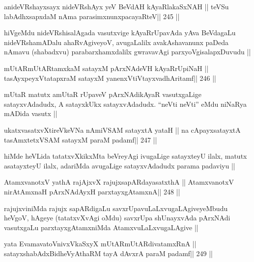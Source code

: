 \begin{shl}
anideVRshayxsayx nideVRshAyx yeV BeVdAH kAyaRlakaSxNAH ||
teVSu labAdhxsapxdaM nAma parasimxnunxpacayaRteV\hfill || 245 ||
\end{shl}

\begin{artha}
hiVgeMdu nideVRshisalAgada vasutxvige kAyaRrUpavAda yAva BeVdagaLu
nideVRshamADalu ahaRvAgiveyoV, avugaLalilx avakAshavanunx paDeda nAmavu
(shabadxvu) parabarxhamxdalilx gwravavAgi parxyoVgisalapxDuvudu ||
\end{artha}

\begin{shl}
mUtARmUtARtamxkaM satayxM pArxNAdeVH kAyaRrUpiNaH ||
tasAyxpeyxVtatapxraM satayxM yanenxVtiVtayxvadhAritamf\hfill || 246 ||
\end{shl}

\begin{artha}
mUtaR matutx amUtaR rUpaveV pArxNAdikAyaR vasutxgaLige satayxvAdadudx,
A satayxkUkx satayxvAdadudx. ``neVti neVti'' eMdu niNaRya mADida vasutx
|| 
\end{artha}


\begin{shl}
ukatxvasatxvXtireVkeVNa nAmiVSAM satayxtA yataH ||
na cApayxsatayxtA tasAmxtetxVSAM satayxM paraM padamf\hfill || 247 ||
\end{shl}

\begin{artha}
hiMde heVLida tatatxvXkikxMta beVreyAgi ivugaLige satayxteyU ilalx,
matutx asatayxteyU ilalx, adariMda avugaLige satayxvAdadudx parama
padaviyu ||
\end{artha}

\begin{shl}
AtamxvanotxV yathA rajAjxvX rajujxsapARdayasatxthA ||
AtamxvanotxV nirAtAmxnaH pArxNAdAyxH parxtayxgAtamxnA\hfill || 248 ||
\end{shl}

\begin{artha}
rajujxviniMda rajujx sapARdigaLu savxrUpavuLaLxvugaLAgiveyeMbudu 
heVgoV, hAgeye (tatatxvXvAgi oMdu) savxrUpa shUnayxvAda pArxNAdi
vasutxgaLu parxtayxgAtamxniMda AtamxvuLaLxvugaLAgive ||
\end{artha}

\begin{shl}
yata EvamavatoV\s nivxVkaSxyX mUtARmUtARdivatamxRnA ||
satayxshabAdxBidheVyAthaRM tayA dAvxrA paraM padamf\hfill || 249 ||
\end{shl}

